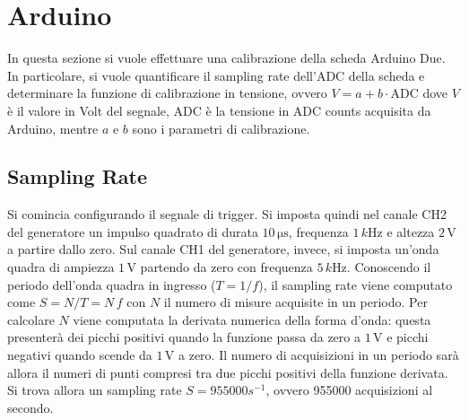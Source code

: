 \documentclass[a4paper,11pt]{article} %
\begin{document}
\cleardoublepage
\cleardoublepage
\section{Arduino}
In questa sezione si vuole effettuare una calibrazione della scheda Arduino Due. In particolare, si vuole quantificare
il sampling rate dell'ADC della scheda e determinare la funzione di calibrazione in tensione, ovvero $V = a
+ b \cdot \text{ADC}$ dove $V$ è il valore in Volt del segnale, $\text{ADC}$ è la tensione in ADC counts acquisita da
Arduino, mentre $a$ e $b$ sono i parametri di calibrazione. 


\subsection{Sampling Rate}
Si comincia configurando il segnale di trigger. Si imposta quindi nel canale CH2 del generatore un impulso quadrato di
durata $10\,\si{\us}$, frequenza $1\,\si{k\hertz}$ e altezza $2\,\si{\volt}$ a partire dallo zero. Sul canale CH1 del
generatore, invece, si imposta un'onda quadra di ampiezza $1\,\si{\volt}$ partendo da zero con frequenza
$5\,\si{k\hertz}$. Conoscendo il periodo dell'onda quadra in ingresso ($T=1/f$), il sampling rate viene computato come
$S = N / T = N \, f$ con $N$ il numero di misure acquisite in un periodo. Per calcolare $N$ viene computata la derivata
numerica della forma d'onda: questa presenterà dei picchi positivi quando la funzione passa da zero a $1\,\si{\volt}$ e
picchi negativi quando scende da $1\,\si{\volt}$ a zero. Il numero di acquisizioni in un periodo sarà allora il numeri
di punti compresi tra due picchi positivi della funzione derivata. Si trova allora un sampling rate $S = 955000 s^{-1}$,
ovvero 955000 acquisizioni al secondo.


\end{document}
